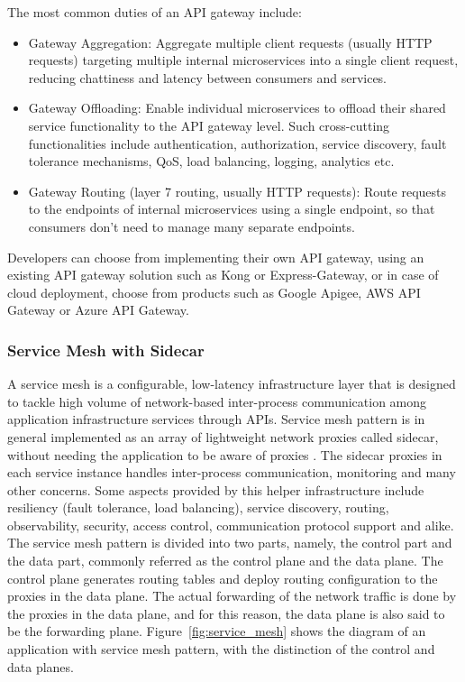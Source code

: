 \documentclass{Configuration_Files/PoliMi3i_thesis}
\begin{document}
The most common duties of an API gateway include:

\begin{itemize}
    \item Gateway Aggregation: Aggregate multiple client requests (usually HTTP requests) targeting multiple internal microservices into a single client request, reducing chattiness and latency between consumers and services.
    
    \item Gateway Offloading: Enable individual microservices to offload their shared service functionality to the API gateway level.
    Such cross-cutting functionalities include authentication, authorization, service discovery, fault tolerance mechanisms, QoS, load balancing, logging, analytics etc.
    
    \item Gateway Routing (layer 7 routing, usually HTTP requests): Route requests to the endpoints of internal microservices using a single endpoint, so that consumers don’t need to manage many separate endpoints.
\end{itemize}

Developers can choose from implementing their own API gateway, using an existing API gateway solution such as Kong or Express-Gateway, or in case of cloud deployment, choose from products such as Google Apigee, AWS API Gateway or Azure API Gateway.

\subsubsection{Service Mesh with Sidecar}
\label{subsubsec:service_mesh}

A service mesh is a configurable, low-latency infrastructure layer that is designed to tackle high volume of network-based inter-process communication among  application infrastructure services through APIs.
Service mesh pattern is in general implemented as an array of lightweight network proxies called sidecar, without needing the application to be aware of proxies \cite{li2019service}. The sidecar proxies in each service instance handles inter-process communication, monitoring and many other concerns.
Some aspects provided by this helper infrastructure include resiliency (fault tolerance, load balancing), service discovery, routing, observability, security, access control, communication protocol support and alike.
\\
The service mesh pattern is divided into two parts, namely, the control part and the data part, commonly referred as the control plane and the data plane. The control plane generates routing tables and deploy routing configuration to the proxies in the data plane. The actual forwarding of the network traffic is done by the proxies in the data plane, and for this reason, the data plane is also said to be the forwarding plane. Figure~\ref{fig:service_mesh} shows the diagram of an application with service mesh pattern, with the distinction of the control and data planes.
\end{document}
